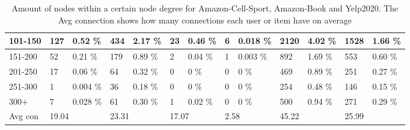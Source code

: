 \begin{table*}[]
\begin{tabular}{|l|l|l|l|l|l|l|l|l|l|l|l|l|}
        101-150 & 127                           & 0.52 \%                                & 434                              & 2.17 \%                    & 23                         & 0.46 \%                    & 6     & 0.018 \%     & 2120  & 4.02 \%  & 1528  & 1.66 \%  \\ \hline
        151-200 & 52                            & 0.21 \%                                & 179                              & 0.89 \%                    & 2                          & 0.04 \%                    & 1     & 0.003     \% & 892   & 1.69 \%  & 553   & 0.60 \%  \\ \hline
        201-250 & 17                            & 0.06 \%                                & 64                               & 0.32 \%                    & 0                          & 0    \%                    & 0     & 0     \%     & 469   & 0.89 \%  & 251   & 0.27 \%  \\ \hline
        251-300 & 1                             & 0.004 \%                               & 36                               & 0.18 \%                    & 0                          & 0    \%                    & 0     & 0     \%     & 254   & 0.48 \%  & 146   & 0.15 \%  \\ \hline
        300+    & 7                             & 0.028 \%                               & 61                               & 0.30 \%                    & 1                          & 0.02 \%                    & 0     & 0  \%        & 500   & 0.94 \%  & 271   & 0.29 \%  \\ \hline
        Avg con & \multicolumn{2}{l|}{19.04}    & \multicolumn{2}{l|}{23.31}             & \multicolumn{2}{l|}{17.07}       & \multicolumn{2}{l|}{2.58}  & \multicolumn{2}{l|}{45.22} & \multicolumn{2}{l|}{25.99}                                                              \\ \hline
    \end{tabular}
    \caption{Amount of nodes within a certain node degree for Amazon-Cell-Sport, Amazon-Book and Yelp2020. The Avg connection shows how many connections each user or item have on average}
    \label{tab:dataset-item-and-user-splits}
\end{table*}

